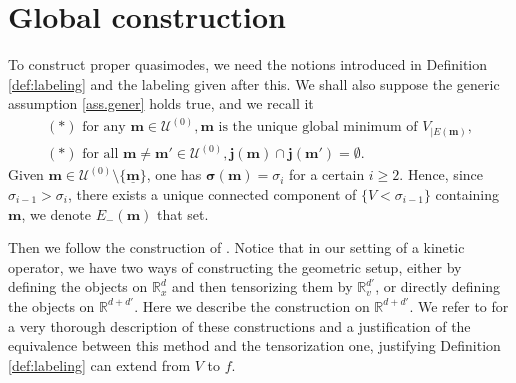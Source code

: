\documentclass[12pt]{amsart}
\newcommand{\R}{\mathbb R}
\newcommand{\bsigma}{\boldsymbol{\sigma}}
\numberwithin{equation}{section}
\numberwithin{figure}{section}
\def\m{\mathbf{m}}
\def\j{\mathbf{j}}
\def\um{\underline{\m}}
\def\uuu{{\mathcal U}}\def\vvv{{\mathcal V}}\def\www{{\mathcal W}}\def\xxx{{\mathcal X}}
\begin{document}
\section{Global construction}\label{sec:global}

To construct proper quasimodes, we need the notions introduced in Definition \ref{def:labeling} and the labeling given after this. We shall also suppose the generic assumption \eqref{ass.gener} holds true, and we recall it
\begin{equation*}\tag{Gener}
\begin{array}{l}
    (\ast)\mbox{ for any }\m\in\uuu^{(0)},\m \mbox{ is the unique global minimum of } V_{|E(\m)},\\
    (\ast)\mbox{ for all }\m\neq\m'\in\uuu^{(0)},\j(\m)\cap\j(\m')=\emptyset.
\end{array}
\end{equation*}
Given $\m\in\uuu^{(0)}\setminus\{\um\}$, one has $\bsigma(\m) = \sigma_i$ for a certain $i\geq2$. Hence, since $\sigma_{i-1} > \sigma_i$, there exists a unique connected component of $\{V<\sigma_{i-1}\}$ containing $\m$, we denote $E_-(\m)$ that set.

Then we follow the construction of \cite[Section 4]{BoLePMi22}. Notice that in our setting of a kinetic operator, we have two ways of constructing the geometric setup, either by defining the objects on $\R^d_x$ and then tensorizing them by $\R^{d'}_v$, or directly defining the objects on $\R^{d+d'}$. Here we describe the construction on $\R^{d+d'}$. We refer to \cite[Section 3.1]{No23} for a very thorough description of these constructions and a justification of the equivalence between this method and the tensorization one, justifying Definition \ref{def:labeling} can extend from $V$ to $f$.
\end{document}
